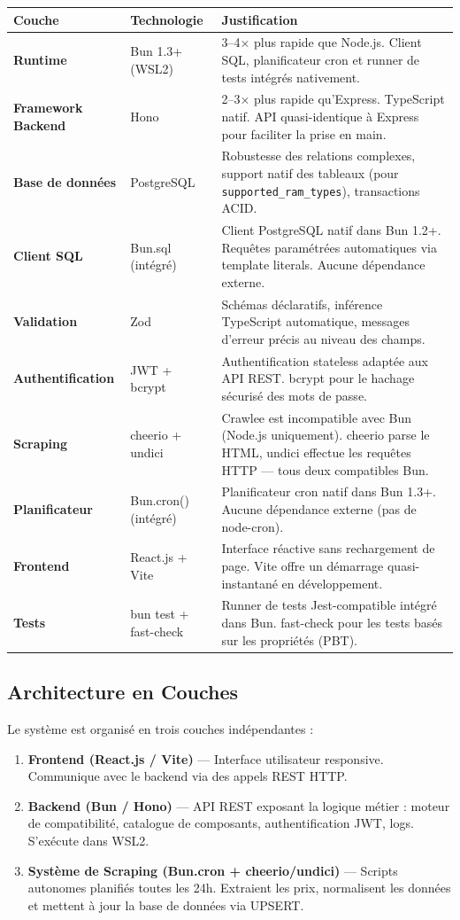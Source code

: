 \documentclass[12pt,a4paper]{article}
\begin{document}
\begin{longtable}{>{\bfseries}p{3cm} p{3.5cm} p{7cm}}
\toprule
\textbf{Couche} & \textbf{Technologie} & \textbf{Justification} \\
\midrule
\endhead
Runtime &
Bun 1.3+ (WSL2) &
3--4× plus rapide que Node.js. Client SQL, planificateur cron et runner de tests intégrés nativement. \\
\midrule
Framework Backend &
Hono &
2--3× plus rapide qu'Express. TypeScript natif. API quasi-identique à Express pour faciliter la prise en main. \\
\midrule
Base de données &
PostgreSQL &
Robustesse des relations complexes, support natif des tableaux (pour \texttt{supported\_ram\_types}), transactions ACID. \\
\midrule
Client SQL &
Bun.sql (intégré) &
Client PostgreSQL natif dans Bun 1.2+. Requêtes paramétrées automatiques via template literals. Aucune dépendance externe. \\
\midrule
Validation &
Zod &
Schémas déclaratifs, inférence TypeScript automatique, messages d'erreur précis au niveau des champs. \\
\midrule
Authentification &
JWT + bcrypt &
Authentification stateless adaptée aux API REST. bcrypt pour le hachage sécurisé des mots de passe. \\
\midrule
Scraping &
cheerio + undici &
Crawlee est incompatible avec Bun (Node.js uniquement). cheerio parse le HTML, undici effectue les requêtes HTTP — tous deux compatibles Bun. \\
\midrule
Planificateur &
Bun.cron() (intégré) &
Planificateur cron natif dans Bun 1.3+. Aucune dépendance externe (pas de node-cron). \\
\midrule
Frontend &
React.js + Vite &
Interface réactive sans rechargement de page. Vite offre un démarrage quasi-instantané en développement. \\
\midrule
Tests &
bun test + fast-check &
Runner de tests Jest-compatible intégré dans Bun. fast-check pour les tests basés sur les propriétés (PBT). \\
\bottomrule
\end{longtable}

\subsection{Architecture en Couches}

Le système est organisé en trois couches indépendantes :

\begin{enumerate}
  \item \textbf{Frontend (React.js / Vite)} — Interface utilisateur responsive. Communique avec le backend via des appels REST HTTP.
  \item \textbf{Backend (Bun / Hono)} — API REST exposant la logique métier : moteur de compatibilité, catalogue de composants, authentification JWT, logs. S'exécute dans WSL2.
  \item \textbf{Système de Scraping (Bun.cron + cheerio/undici)} — Scripts autonomes planifiés toutes les 24h. Extraient les prix, normalisent les données et mettent à jour la base de données via UPSERT.
\end{enumerate}
\end{document}
